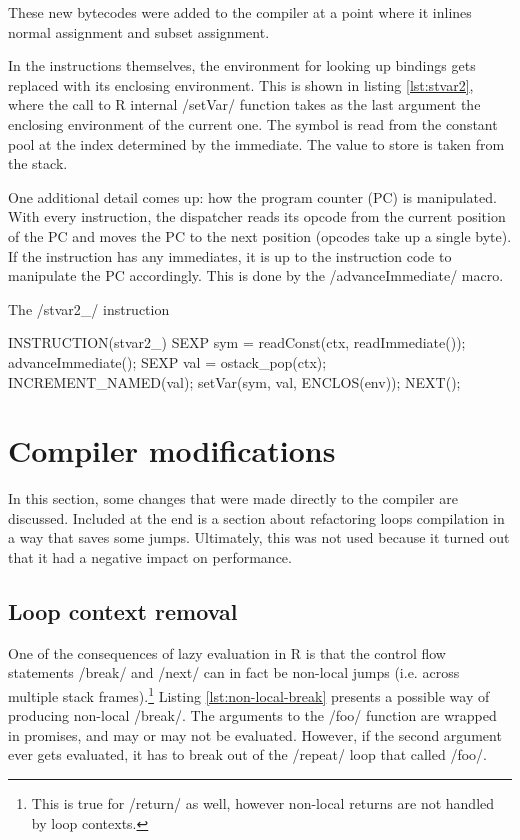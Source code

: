 These new bytecodes were added to the compiler at a point where it inlines normal assignment and subset assignment.

In the instructions themselves, the environment for looking up bindings gets replaced with its enclosing environment. This is shown in listing \ref{lst:stvar2}, where the call to R internal \cinline/setVar/ function takes as the last argument the enclosing environment of the current one. The symbol is read from the constant pool at the index determined by the immediate. The value to store is taken from the stack.

One additional detail comes up: how the program counter (PC) is manipulated. With every instruction, the dispatcher reads its opcode from the current position of the PC and moves the PC to the next position (opcodes take up a single byte). If the instruction has any immediates, it is up to the instruction code to manipulate the PC accordingly. This is done by the \cinline/advanceImmediate/ macro.

\begin{listing}[htbp]
  \caption{\label{lst:stvar2}The \cinline/stvar2_/ instruction}
  \begin{ccode}
INSTRUCTION(stvar2_) {
    SEXP sym = readConst(ctx, readImmediate());
    advanceImmediate();
    SEXP val = ostack_pop(ctx);
    INCREMENT_NAMED(val);
    setVar(sym, val, ENCLOS(env));
    NEXT();
}
  \end{ccode}
\end{listing}


\section{Compiler modifications}

In this section, some changes that were made directly to the compiler are discussed. Included at the end is a section about refactoring loops compilation in a way that saves some jumps. Ultimately, this was not used because it turned out that it had a negative impact on performance.


\subsection{Loop context removal}

One of the consequences of lazy evaluation in R is that the control flow statements \rinline/break/ and \rinline/next/ can in fact be non-local jumps (i.e. across multiple stack frames).\footnote{This is true for \rinline/return/ as well, however non-local returns are not handled by loop contexts.} Listing \ref{lst:non-local-break} presents a possible way of producing non-local \rinline/break/. The arguments to the \rinline/foo/ function are wrapped in promises, and may or may not be evaluated. However, if the second argument ever gets evaluated, it has to break out of the \rinline/repeat/ loop that called \rinline/foo/.

